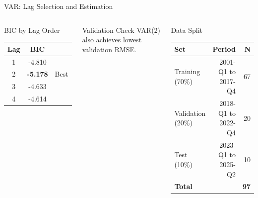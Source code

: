 \documentclass[9pt, aspectratio=169, t]{beamer}
\begin{document}
\begin{frame}{VAR: Lag Selection and Estimation}
    \begin{columns}[T]
        \begin{block}{BIC by Lag Order}
            \begin{center}
            \begin{tabular}{ccc}
                \toprule
                \textbf{Lag} & \textbf{BIC} & \\
                \midrule
                1 & -4.810 & \\
                \rowcolor{Forest!20} 2 & \textbf{-5.178} & Best \\
                3 & -4.633 & \\
                4 & -4.614 & \\
                \bottomrule
            \end{tabular}
            \end{center}
        \end{block}

        \vspace{0.2cm}

        \begin{exampleblock}{Validation Check}
            VAR(2) also achieves lowest validation RMSE.
        \end{exampleblock}

        \begin{block}{Data Split}
            \begin{center}
            \begin{tabular}{lrr}
                \toprule
                \textbf{Set} & \textbf{Period} & \textbf{N} \\
                \midrule
                Training (70\%) & 2001-Q1 to 2017-Q4 & 67 \\
                Validation (20\%) & 2018-Q1 to 2022-Q4 & 20 \\
                Test (10\%) & 2023-Q1 to 2025-Q2 & 10 \\
                \midrule
                \textbf{Total} & & \textbf{97} \\
                \bottomrule
            \end{tabular}
            \end{center}
        \end{block}
    \end{columns}
\end{frame}
\end{document}
